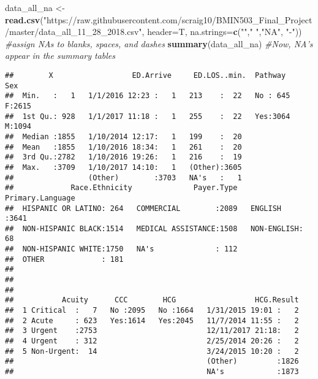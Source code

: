 \documentclass[]{article}
\newenvironment{Shaded}{\begin{snugshade}}{\end{snugshade}}
\newcommand{\KeywordTok}[1]{\textcolor[rgb]{0.13,0.29,0.53}{\textbf{#1}}}
\newcommand{\DataTypeTok}[1]{\textcolor[rgb]{0.13,0.29,0.53}{#1}}
\newcommand{\StringTok}[1]{\textcolor[rgb]{0.31,0.60,0.02}{#1}}
\newcommand{\CommentTok}[1]{\textcolor[rgb]{0.56,0.35,0.01}{\textit{#1}}}
\newcommand{\NormalTok}[1]{#1}
\begin{document}
\begin{Shaded}
\begin{Highlighting}[]
\NormalTok{data_all_na <-}\StringTok{ }\KeywordTok{read.csv}\NormalTok{(}\StringTok{"https://raw.githubusercontent.com/scraig10/BMIN503_Final_Project/master/data_all_11_28_2018.csv"}\NormalTok{, }\DataTypeTok{header=}\NormalTok{T, }\DataTypeTok{na.strings=}\KeywordTok{c}\NormalTok{(}\StringTok{""}\NormalTok{,}\StringTok{" "}\NormalTok{,}\StringTok{"NA"}\NormalTok{, }\StringTok{"-"}\NormalTok{)) }\CommentTok{#assign NAs to blanks, spaces, and dashes}
\KeywordTok{summary}\NormalTok{(data_all_na) }\CommentTok{#Now, NA's appear in the summary tables}
\end{Highlighting}
\end{Shaded}

\begin{verbatim}
##        X                  ED.Arrive     ED.LOS..min.  Pathway    Sex     
##  Min.   :   1   1/1/2016 12:23 :   1   213    :  22   No : 645   F:2615  
##  1st Qu.: 928   1/1/2017 11:18 :   1   255    :  22   Yes:3064   M:1094  
##  Median :1855   1/10/2014 12:17:   1   199    :  20                      
##  Mean   :1855   1/10/2016 18:34:   1   261    :  20                      
##  3rd Qu.:2782   1/10/2016 19:26:   1   216    :  19                      
##  Max.   :3709   1/10/2017 14:10:   1   (Other):3605                      
##                 (Other)        :3703   NA's   :   1                      
##             Race.Ethnicity              Payer.Type      Primary.Language
##  HISPANIC OR LATINO: 264   COMMERCIAL        :2089   ENGLISH    :3641   
##  NON-HISPANIC BLACK:1514   MEDICAL ASSISTANCE:1508   NON-ENGLISH:  68   
##  NON-HISPANIC WHITE:1750   NA's              : 112                      
##  OTHER             : 181                                                
##                                                                         
##                                                                         
##                                                                         
##           Acuity      CCC        HCG                  HCG.Result  
##  1 Critical  :   7   No :2095   No :1664   1/31/2015 19:01 :   2  
##  2 Acute     : 623   Yes:1614   Yes:2045   11/7/2014 11:55 :   2  
##  3 Urgent    :2753                         12/11/2017 21:18:   2  
##  4 Urgent    : 312                         2/25/2014 20:26 :   2  
##  5 Non-Urgent:  14                         3/24/2015 10:20 :   2  
##                                            (Other)         :1826  
##                                            NA's            :1873  

\end{verbatim}
\end{document}
